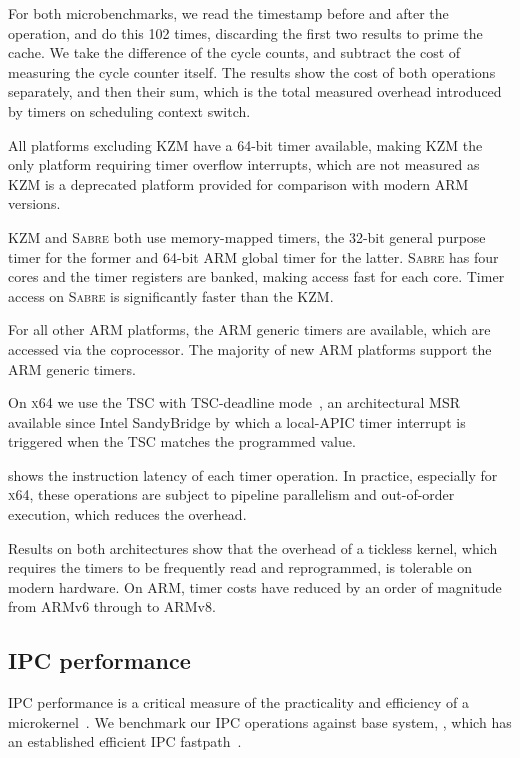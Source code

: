 For both microbenchmarks, we read the timestamp before and after the operation, and do this 102
times, discarding the first two results to prime the cache.  We take the difference of the cycle
counts, and subtract the cost of measuring the cycle counter itself. The results show the cost of
both operations separately, and then their sum, which is the total measured overhead introduced by timers on
scheduling context switch.

All platforms excluding \textsc{KZM} have a 64-bit timer available, making \textsc{KZM} the only
platform requiring timer overflow interrupts, which are not measured as \textsc{KZM} is a deprecated
platform provided for comparison with modern ARM versions.

\textsc{KZM} and \textsc{Sabre} both use memory-mapped timers, the 32-bit general purpose timer for
the former and 64-bit ARM global timer for the latter. \textsc{Sabre} has four cores and the timer
registers are banked, making access fast for each core. Timer access on \textsc{Sabre} is
significantly faster than the \textsc{KZM}. 

For all other ARM platforms, the ARM generic timers are available, which are accessed via the
coprocessor. The majority of new ARM platforms support the ARM generic timers. 

On \textsc{x64} we use the \gls{TSC} with \gls{TSC}-deadline
mode~\citep{Intel_64_IA-32:asdmspg_325384}, an architectural \gls{MSR} available since
Intel SandyBridge by which a local-APIC timer interrupt is triggered when the \gls{TSC} matches the
programmed value. 

 shows the instruction latency of each timer operation. In practice, especially
for \textsc{x64}, these operations are subject to pipeline parallelism and out-of-order execution, which
reduces the overhead.

Results on both architectures show that the overhead of a tickless kernel, which requires the timers
to be frequently read and reprogrammed, is tolerable on modern hardware. On ARM, timer costs have
reduced by an order of magnitude from ARMv6 through to ARMv8. 

\subsection{IPC performance}

\Gls{IPC} performance is a critical measure of the practicality and efficiency of a
microkernel~\citep{Liedtke_95}. We benchmark our \gls{IPC} operations against base system, \selfour,
which has an established efficient \gls{IPC} fastpath~\citep{Elphinstone_Heiser_13}. 

